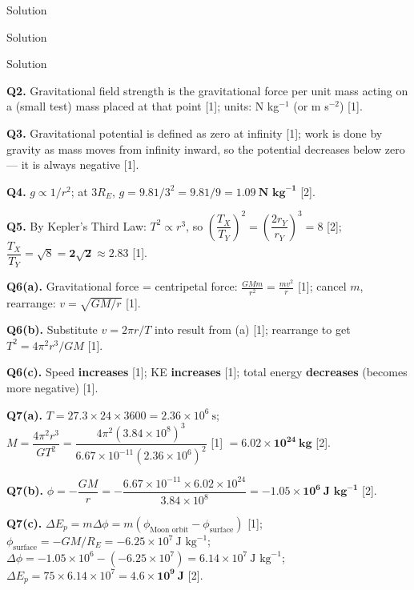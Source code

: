 \documentclass[12pt,a4paper]{article}
\begin{document}
\begin{examplebox}{Solution}
\begin{examplebox}{Solution}
\begin{examplebox}{Solution}
\begin{markscheme}
\vspace{0.5em}\textbf{Q2.} Gravitational field strength is the gravitational force per unit mass acting on a (small test) mass placed at that point [1]; units: N kg$^{-1}$ (or m s$^{-2}$) [1].

\vspace{0.5em}\textbf{Q3.} Gravitational potential is defined as zero at infinity [1]; work is done by gravity as mass moves from infinity inward, so the potential decreases below zero — it is always negative [1].

\vspace{0.5em}\textbf{Q4.} $g \propto 1/r^2$; at $3R_E$, $g = 9.81/3^2 = 9.81/9 = \mathbf{1.09\ \text{N kg}^{-1}}$ [2].

\vspace{0.5em}\textbf{Q5.} By Kepler's Third Law: $T^2 \propto r^3$, so $\left(\dfrac{T_X}{T_Y}\right)^2 = \left(\dfrac{2r_Y}{r_Y}\right)^3 = 8$ [2]; $\dfrac{T_X}{T_Y} = \sqrt{8} = \mathbf{2\sqrt{2} \approx 2.83}$ [1].

\vspace{0.5em}\textbf{Q6(a).} Gravitational force = centripetal force: $\frac{GMm}{r^2} = \frac{mv^2}{r}$ [1]; cancel $m$, rearrange: $v = \sqrt{GM/r}$ [1].

\vspace{0.5em}\textbf{Q6(b).} Substitute $v = 2\pi r/T$ into result from (a) [1]; rearrange to get $T^2 = 4\pi^2 r^3/GM$ [1].

\vspace{0.5em}\textbf{Q6(c).} Speed \textbf{increases} [1]; KE \textbf{increases} [1]; total energy \textbf{decreases} (becomes more negative) [1].

\vspace{0.5em}\textbf{Q7(a).} $T = 27.3 \times 24 \times 3600 = 2.36\times10^6\ \text{s}$; $M = \dfrac{4\pi^2 r^3}{GT^2} = \dfrac{4\pi^2 (3.84\times10^8)^3}{6.67\times10^{-11}(2.36\times10^6)^2}$ [1] $= \mathbf{6.02\times10^{24}\ \text{kg}}$ [2].

\vspace{0.5em}\textbf{Q7(b).} $\phi = -\dfrac{GM}{r} = -\dfrac{6.67\times10^{-11}\times 6.02\times10^{24}}{3.84\times10^8} = \mathbf{-1.05\times10^6\ \text{J kg}^{-1}}$ [2].

\vspace{0.5em}\textbf{Q7(c).} $\Delta E_p = m\Delta\phi = m(\phi_{\text{Moon orbit}} - \phi_{\text{surface}})$ [1]; $\phi_\text{surface} = -GM/R_E = -6.25\times10^7\ \text{J kg}^{-1}$; $\Delta\phi = -1.05\times10^6 - (-6.25\times10^7) = 6.14\times10^7\ \text{J kg}^{-1}$; $\Delta E_p = 75\times 6.14\times10^7 = \mathbf{4.6\times10^9\ \text{J}}$ [2].


\end{markscheme}
\end{examplebox}
\end{examplebox}
\end{examplebox}
\end{document}
